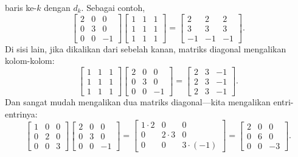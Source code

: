 baris ke-$k$ dengan $d_k$. Sebagai contoh,
\begin{equation*}
\begin{bmatrix}
2 & 0 & 0 \\
0 & 3 & 0 \\
0 & 0 & -1
\end{bmatrix}
\begin{bmatrix}
1 & 1 & 1 \\
1 & 1 & 1 \\
1 & 1 & 1
\end{bmatrix}
=
\begin{bmatrix}
2 & 2 & 2 \\
3 & 3 & 3 \\
-1 & -1 & -1
\end{bmatrix} .
\end{equation*}
Di sisi lain, jika dikalikan dari sebelah kanan, matriks diagonal mengalikan kolom-kolom:
\begin{equation*}
\begin{bmatrix}
1 & 1 & 1 \\
1 & 1 & 1 \\
1 & 1 & 1
\end{bmatrix}
\begin{bmatrix}
2 & 0 & 0 \\
0 & 3 & 0 \\
0 & 0 & -1
\end{bmatrix}
=
\begin{bmatrix}
2 & 3 & -1 \\
2 & 3 & -1 \\
2 & 3 & -1
\end{bmatrix} .
\end{equation*}
Dan sangat mudah mengalikan dua matriks diagonal---kita
mengalikan entri-entrinya:
\begin{equation*}
\begin{bmatrix}
1 & 0 & 0 \\
0 & 2 & 0 \\
0 & 0 & 3
\end{bmatrix}
\begin{bmatrix}
2 & 0 & 0 \\
0 & 3 & 0 \\
0 & 0 & -1
\end{bmatrix}
=
\begin{bmatrix}
1 \cdot 2 & 0 & 0 \\
0 & 2 \cdot 3 & 0 \\
0 & 0 & 3 \cdot (-1)
\end{bmatrix}
=
\begin{bmatrix}
2 & 0 & 0 \\
0 & 6 & 0 \\
0 & 0 & -3
\end{bmatrix} .
\end{equation*}

